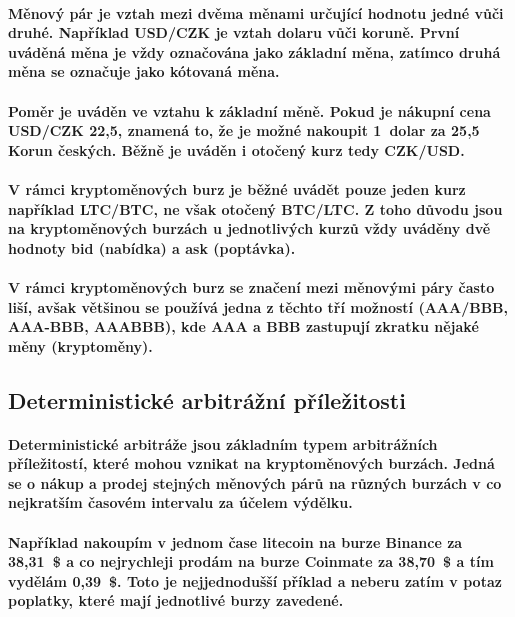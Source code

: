 \documentclass[thesis=B,czech]{FITthesis}[2019/03/21]
\begin{document}
\paragraph{
Měnový pár je vztah mezi dvěma měnami určující hodnotu jedné vůči druhé. Například USD/CZK je vztah dolaru vůči koruně. První uváděná měna je vždy označována jako základní měna, zatímco druhá měna se označuje jako kótovaná měna. \cite{Capital_menovy_par} 
} 
\paragraph{
Poměr je uváděn ve vztahu k základní měně. Pokud je nákupní cena USD/CZK 22,5, znamená to, že je možné nakoupit 1~dolar za 25,5~ Korun českých. Běžně je uváděn i otočený kurz tedy CZK/USD. \cite{Capital_menovy_par} 
}
\paragraph{
V rámci kryptoměnových burz je běžné uvádět pouze jeden kurz například LTC/BTC, ne však otočený BTC/LTC. Z toho důvodu jsou na kryptoměnových burzách u jednotlivých kurzů vždy uváděny dvě hodnoty bid (nabídka) a ask (poptávka). 
}
\paragraph{
V rámci kryptoměnových burz se značení mezi měnovými páry často liší, avšak většinou se používá jedna z těchto tří možností (AAA/BBB, AAA-BBB, AAABBB), kde AAA a BBB zastupují zkratku nějaké měny (kryptoměny).
}
\subsection{Deterministické arbitrážní příležitosti}
\paragraph{
Deterministické arbitráže jsou základním typem arbitrážních příležitostí, které mohou vznikat na kryptoměnových burzách. Jedná se o nákup a prodej stejných měnových párů na různých burzách v co nejkratším časovém intervalu za účelem výdělku. \cite{CZInvestor} \cite{TowardsDataScience}
}
\paragraph{
Například nakoupím v jednom čase litecoin na burze Binance za 38,31~\$ a co nejrychleji prodám na burze Coinmate za 38,70~\$ a tím vydělám 0,39~\$. Toto je nejjednodušší příklad a neberu zatím v potaz poplatky, které mají jednotlivé burzy zavedené. 
}
\end{document}
